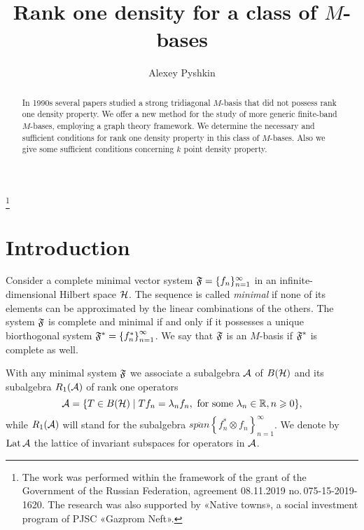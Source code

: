 \documentclass[12pt,oneside,a4paper]{amsart}
\begin{document}
\title{Rank one density for a class of $M$-bases}
\author{Alexey Pyshkin}
\address{Chebyshev Laboratory, Saint Petersburg State University, 14th Line V.O. 29, Saint Petersburg 199178, Russia}
\address{Saint Petersburg Department of RAS, Steklov Math. Institute, Fontanka 27, Saint Petersburg 191023, Russia}
\address{Euler International Mathematical Institute, nab.\,Pesochnaya 10, Saint Petersburg 197022, Russia}


\begin{abstract}
  In 1990s several papers studied a strong tridiagonal $M$-basis
    that did not possess rank one density property.
  We offer a new method for the study of more generic finite-band $M$-bases,
    employing a graph theory framework.
  We determine the necessary and sufficient conditions for rank one density property
    in this class of $M$-bases.
  Also we give some sufficient conditions concerning $k$ point density property.
\end{abstract}
\thanks{
        The work was performed within the framework of the grant of the Government
          of the Russian Federation, agreement 08.11.2019 no.\,075-15-2019-1620.
        The research was also supported by «Native towns», a social investment program of PJSC «Gazprom Neft».
        }
\maketitle
\section{Introduction}
  Consider a complete minimal vector system $\fsys = \seq{f}$ in an infinite-dimensional Hilbert space $\cal{H}$.
  The sequence is called \emph{minimal} if none of its elements can be approximated by the linear combinations of the others.
  The system $\fsys$ is complete and minimal if and only if it possesses a unique biorthogonal system $\fstarsys=\left\{f_n^*\right\}_{n=1}^\infty$.
  We say that $\fsys$ is an $M$-basis if $\fstarsys$ is complete as well.

  With any minimal system $\fsys$ we associate a subalgebra $\cal{A}$ of $B(\cal{H})$ and its subalgebra $R_1(\cal{A})$ of rank one operators 
  \[
    \cal{A} = \{T\in B(\cal{H}) \mid Tf_n = \lambda_n f_n, \text{ for some } \lambda_n \in \mathbb{R}, n \geq 0\},
  \]
    while $R_1(\cal{A})$ will stand for the subalgebra $\overline{span}\left\{f^*_n \otimes f_n\right\}_{n = 1}^\infty$.
  We denote by $\lattice$ the lattice of invariant subspaces for operators in $\cal{A}$.
\end{document}

